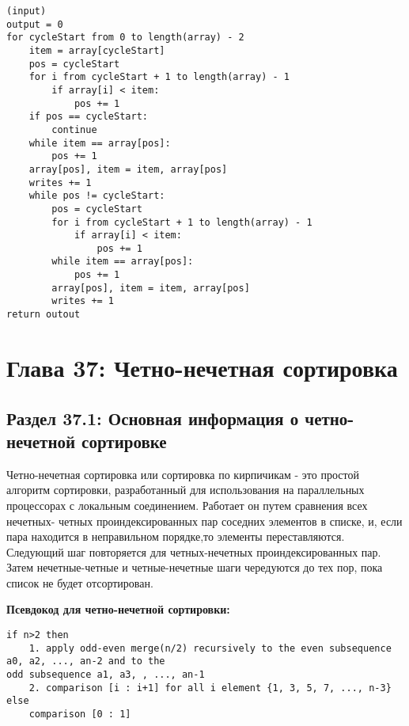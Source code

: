 \vspace{\baselineskip}
\begin{tcolorbox}
\begin{verbatim} 
(input)
output = 0
for cycleStart from 0 to length(array) - 2
	item = array[cycleStart]
	pos = cycleStart
	for i from cycleStart + 1 to length(array) - 1
		if array[i] < item:
			pos += 1
	if pos == cycleStart:
		continue
	while item == array[pos]:
		pos += 1
	array[pos], item = item, array[pos]
	writes += 1
	while pos != cycleStart:
		pos = cycleStart
		for i from cycleStart + 1 to length(array) - 1
			if array[i] < item:
				pos += 1
		while item == array[pos]:
			pos += 1
		array[pos], item = item, array[pos]
		writes += 1
return outout

\end{verbatim}
\end{tcolorbox}

\chapter*{Глава 37: Четно-нечетная сортировка}
\section*{Раздел 37.1: Основная информация о четно-нечетной сортировке} 

\vspace{\baselineskip}
Четно-нечетная сортировка или сортировка по кирпичикам - это простой алгоритм сортировки, разработанный для использования на параллельных процессорах с локальным соединением. Работает он путем сравнения всех нечетных- четных проиндексированных пар соседних элементов в списке, и, если пара находится в неправильном порядке,то элементы переставляются. Следующий шаг повторяется для четных-нечетных проиндексированных пар. Затем нечетные-четные и четные-нечетные шаги чередуются до тех пор, пока список не будет отсортирован.

\vspace{\baselineskip}
\textbf{Псевдокод для четно-нечетной сортировки:}

\vspace{\baselineskip}
\begin{tcolorbox}
\begin{verbatim} 
if n>2 then
	1. apply odd-even merge(n/2) recursively to the even subsequence a0, a2, ..., an-2 and to the
odd subsequence a1, a3, , ..., an-1
	2. comparison [i : i+1] for all i element {1, 3, 5, 7, ..., n-3}
else
	comparison [0 : 1]

\end{verbatim}
\end{tcolorbox}

